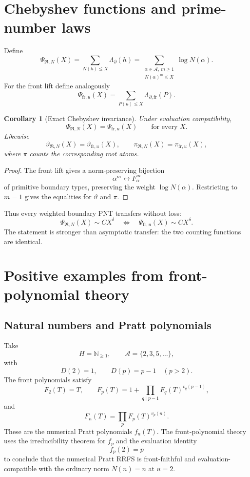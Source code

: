 \documentclass[11pt]{article}
\newcommand{\NN}{\mathbb N}
\newcommand{\cR}{\mathfrak R}
\newcommand{\cA}{\mathcal A}
\newcommand{\fr}{\mathrm{fr}}
\newcommand{\bd}{\partial}
\newcommand{\Lam}{\Lambda}
\newtheorem{corollary}[theorem]{Corollary}
\begin{document}
\section{Chebyshev functions and prime-number laws}

Define
\[
\Psi_{\cR,N}(X)
=
\sum_{N(h)\le X}\Lam_{\bd}(h)
=
\sum_{\substack{\alpha\in\cA,\ m\ge1\\N(\alpha)^m\le X}}
\log N(\alpha).
\]
For the front lift define analogously
\[
\Psi_{\fr,u}(X)
=
\sum_{P(u)\le X}\Lam_{\bd,\fr}(P).
\]

\begin{corollary}[Exact Chebyshev invariance]\label{cor:psi}
Under evaluation compatibility,
\[
\boxed{
\Psi_{\cR,N}(X)=\Psi_{\fr,u}(X)
\qquad\text{for every }X.}
\]
Likewise
\[
\vartheta_{\cR,N}(X)=\vartheta_{\fr,u}(X),
\qquad
\pi_{\cR,N}(X)=\pi_{\fr,u}(X),
\]
where $\pi$ counts the corresponding root atoms.
\end{corollary}

\begin{proof}
The front lift gives a norm-preserving bijection
\[
\alpha^m\longleftrightarrow F_\alpha^m
\]
of primitive boundary types, preserving the weight $\log N(\alpha)$. Restricting to $m=1$ gives the equalities for $\vartheta$ and $\pi$.
\end{proof}

Thus every weighted boundary PNT transfers without loss:
\[
\Psi_{\cR,N}(X)\sim C X^\delta
\quad\Longleftrightarrow\quad
\Psi_{\fr,u}(X)\sim C X^\delta.
\]
The statement is stronger than asymptotic transfer: the two counting functions are identical.

\section{Positive examples from front-polynomial theory}

\subsection{Natural numbers and Pratt polynomials}

Take
\[
H=\NN_{\ge1},\qquad \cA=\{2,3,5,\ldots\},
\]
with
\[
D(2)=1,\qquad D(p)=p-1\quad(p>2).
\]
The front polynomials satisfy
\[
F_2(T)=T,
\qquad
F_p(T)=1+\prod_{q\mid p-1}F_q(T)^{v_q(p-1)},
\]
and
\[
F_n(T)=\prod_pF_p(T)^{v_p(n)}.
\]
These are the numerical Pratt polynomials $f_n(T)$. The front-polynomial theory uses the irreducibility theorem for $f_p$ and the evaluation identity
\[
f_p(2)=p
\]
to conclude that the numerical Pratt RRFS is front-faithful and evaluation-compatible with the ordinary norm $N(n)=n$ at $u=2$.
\end{document}
